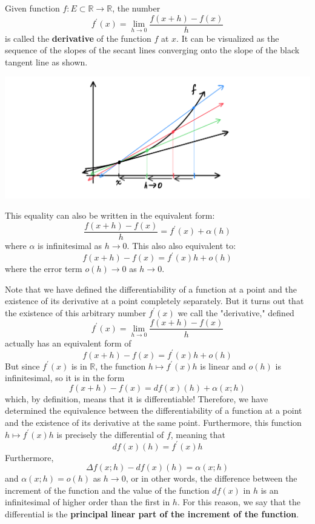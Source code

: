 \documentclass{article}
\begin{document}
    \begin{definition}[Derivative]
      Given function $f: E \subset \mathbb{R} \longrightarrow \mathbb{R}$, the number
      \[f^\prime (x) = \lim_{h \rightarrow 0} \frac{f(x+h) - f(x)}{h}\]
      is called the \textbf{derivative} of the function $f$ at $x$. It can be visualized as the sequence of the slopes of the secant lines converging onto the slope of the black tangent line as shown. 
      \begin{center}
          \includegraphics[scale=0.27]{img/Tangent_Lines_Converging.PNG}
      \end{center}
      This equality can also be written in the equivalent form: 
      \[\frac{f(x+h) - f(x)}{h} = f^\prime (x) + \alpha (h)\]
      where $\alpha$ is infinitesimal as $h \rightarrow 0$. This also also equivalent to:
      \[f(x+h) - f(x) = f^\prime (x) h + o (h)\]
      where the error term $o(h) \rightarrow 0$ as $h \rightarrow 0$. 
    \end{definition}

    Note that we have defined the differentiability of a function at a point and the existence of its derivative at a point completely separately. But it turns out that the existence of this arbitrary number $f^\prime (x)$ we call the "derivative," defined
    \[f^\prime (x) = \lim_{h \rightarrow 0} \frac{f(x + h) - f(x)}{h}\]
    actually has an equivalent form of 
    \[f(x + h) - f(x) = f^\prime (x) h + o(h)\]
    But since $f^\prime(x)$ is in $\mathbb{R}$, the function $h \mapsto f^\prime (x) h$ is linear and $o(h)$ is infinitesimal, so it is in the form 
    \[f(x + h) - f(x) = df (x) (h) + \alpha(x; h)\]
    which, by definition, means that it is differentiable! Therefore, we have determined the equivalence between the differentiability of a function at a point and the existence of its derivative at the same point. Furthermore, this function $h \mapsto f^\prime (x) h$ is precisely the differential of $f$, meaning that
    \[df (x) (h) = f^\prime (x) h\]
    Furthermore, 
    \[\Delta f(x; h) - df(x)(h) = \alpha (x; h)\]
    and $\alpha(x;h) = o (h)$ as $h \rightarrow 0$, or in other words, the difference between the increment of the function and the value of the function $df(x)$ in $h$ is an infinitesimal of higher order than the first in $h$. For this reason, we say that the differential is the \textbf{principal linear part of the increment of the function}. 
\end{document}
